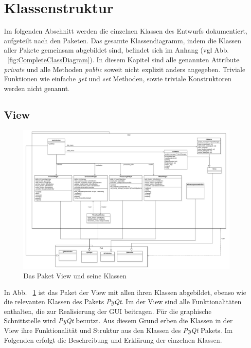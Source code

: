 \documentclass{article}
\begin{document}
\newpage
\section{Klassenstruktur}
Im folgenden Abschnitt werden die einzelnen Klassen des Entwurfs dokumentiert, aufgeteilt nach den Paketen. Das gesamte Klassendiagramm, indem die Klassen aller Pakete gemeinsam abgebildet sind, befindet sich im Anhang (vgl Abb. ~\ref{fig:CompleteClassDiagram}). In diesem Kapitel sind alle genannten Attribute \emph{private} und alle Methoden \emph{public} soweit nicht explizit anders angegeben. Triviale Funktionen wie einfache \emph{get} und \emph{set} Methoden, sowie triviale Konstruktoren werden nicht genannt.

\subsection{View}
\begin{figure}[H]%
    \centering
    \includegraphics[width=13cm]{entwurf/Entwurf_dokument/img/Alissa/ViewUpdated.png}
    \caption{Das Paket View und seine Klassen}
    \label{fig:classDiagrammView}
\end{figure}
In Abb. ~\ref{fig:classDiagrammView} ist das Paket der View mit allen ihren Klassen abgebildet, ebenso wie die relevanten Klassen des Pakets \emph{PyQt}.
Im der View sind alle Funktionalitäten enthalten, die zur Realisierung der GUI beitragen. Für die graphische Schnittstelle wird \emph{PyQt} benutzt. Aus diesem Grund erben die Klassen in der View ihre Funktionalität und Struktur aus den Klassen des \emph{PyQt} Pakets. Im Folgenden erfolgt die Beschreibung und Erklärung der einzelnen Klassen.
\end{document}

